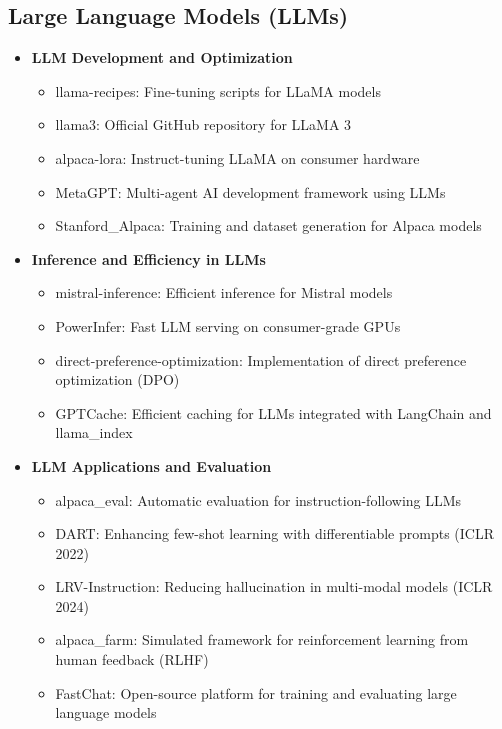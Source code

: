 \subsection*{Large Language Models (LLMs)}
\begin{itemize}
    \item \textbf{LLM Development and Optimization}
    \begin{itemize}
        \item llama-recipes: Fine-tuning scripts for LLaMA models
        \item llama3: Official GitHub repository for LLaMA 3
        \item alpaca-lora: Instruct-tuning LLaMA on consumer hardware
        \item MetaGPT: Multi-agent AI development framework using LLMs
        \item Stanford\_Alpaca: Training and dataset generation for Alpaca models
    \end{itemize}
    \item \textbf{Inference and Efficiency in LLMs}
    \begin{itemize}
        \item mistral-inference: Efficient inference for Mistral models
        \item PowerInfer: Fast LLM serving on consumer-grade GPUs
        \item direct-preference-optimization: Implementation of direct preference optimization (DPO)
        \item GPTCache: Efficient caching for LLMs integrated with LangChain and llama\_index
    \end{itemize}
    \item \textbf{LLM Applications and Evaluation}
    \begin{itemize}
        \item alpaca\_eval: Automatic evaluation for instruction-following LLMs
        \item DART: Enhancing few-shot learning with differentiable prompts (ICLR 2022)
        \item LRV-Instruction: Reducing hallucination in multi-modal models (ICLR 2024)
        \item alpaca\_farm: Simulated framework for reinforcement learning from human feedback (RLHF)
        \item FastChat: Open-source platform for training and evaluating large language models
    \end{itemize}
\end{itemize}


